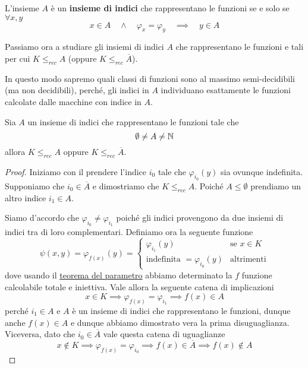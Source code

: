 \begin{definition}
	L'insieme $A$ è un \textbf{insieme di indici} che
	rappresentano le funzioni se e solo se $\forall x, y$
	\[
		x \in A \quad \land \quad \varphi_x = \varphi_y
		\quad \implies \quad y \in A
	\]
\end{definition}

Passiamo ora a studiare gli insiemi di indici $A$ che
rappresentano le funzioni e tali per cui $K \leq_{rec} A$ (oppure
$K \leq_{rec} \overline{A}$).

In questo modo sapremo quali classi di funzioni sono al massimo
semi-decidibili (ma non decidibili), perché, gli indici in $A$
individuano esattamente le funzioni calcolate dalle macchine con
indice in $A$.

\begin{theorem} \label{th: indici}
	Sia $A$ un insieme di indici che rappresentano le funzioni
	tale che
	\[ \emptyset \neq A \neq \mathbb{N} \]
	allora $K \leq_{rec} A$ oppure $K \leq_{rec} \overline{A}$.
	\begin{proof}
		Iniziamo con il prendere l'indice $i_0$ tale che
		$\varphi_{i_0}(y)$ sia ovunque indefinita. Supponiamo
		che $i_0 \in \overline{A}$ e dimostriamo che
		$K \leq_{rec} A$. Poiché $A \leq \emptyset$ prendiamo un
		altro indice $i_1 \in A$.

		Siamo d'accordo che $\varphi_{i_0} \neq \varphi_{i_1}$
		poiché gli indici provengono da due insiemi di indici
		tra di loro complementari. Definiamo ora la seguente
		funzione
		\[
			\psi (x, y) = \varphi_{f(x)} (y) = \begin{cases}
				\varphi_{i_1} (y)                      & \text{se } x \in K \\
				\text{indefinita } = \varphi_{i_0} (y) & \text{altrimenti}
			\end{cases}
		\]
		dove usando il \hyperref[th: s-m-n]{teorema del parametro}
		abbiamo determinato la $f$ funzione calcolabile totale e
		iniettiva. Vale allora la seguente catena di implicazioni
		\[
			x \in K \implies \varphi_{f(x)} = \varphi_{i_1}
			\implies f(x) \in A
		\]
		perché $i_1 \in A$ e $A$ è un insieme di indici che
		rappresentano le funzioni, dunque anche $f(x) \in A$ e
		dunque abbiamo dimostrato vera la prima disuguaglianza.
		Viceversa, dato che $i_0 \in \overline{A}$ vale questa
		catena di uguaglianze
		\[
			x \notin K \implies \varphi_{f(x)} = \varphi_{i_0}
			\implies f(x) \in \overline{A} \implies f(x) \notin A
		\]
	\end{proof}
\end{theorem}

